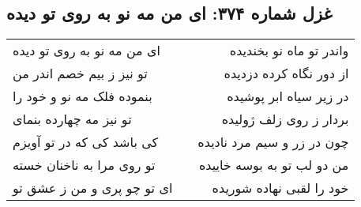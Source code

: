 \begin{center}
\section*{غزل شماره ۳۷۴: ای من مه نو به روی تو دیده}
\label{sec:374}
\begin{longtable}{l p{0.5cm} r}
ای من مه نو به روی تو دیده
&&
واندر تو ماه نو بخندیده
\\
تو نیز ز بیم خصم اندر من
&&
از دور نگاه کرده دزدیده
\\
بنموده فلک مه نو و خود را
&&
در زیر سیاه ابر پوشیده
\\
تو نیز مه چهارده بنمای
&&
بردار ز روی زلف ژولیده
\\
کی باشد کی که در تو آویزم
&&
چون در زر و سیم مرد نادیده
\\
تو روی مرا به ناخنان خسته
&&
من دو لب تو به بوسه خاییده
\\
ای تو چو پری و من ز عشق تو
&&
خود را لقبی نهاده شوریده
\\
\end{longtable}
\end{center}
